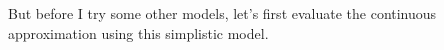 \documentclass[a4paper,12pt]{article}
\begin{document}
But before I try some other models, let's first evaluate the continuous approximation using this simplistic model.




















%
%



\nocite{*}
\newpage
\printbibliography
\end{document}
